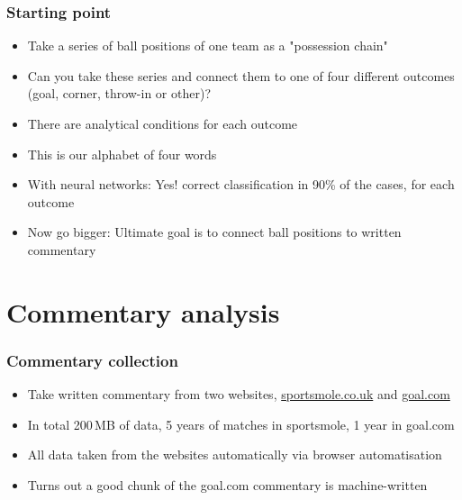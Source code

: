 \documentclass{beamer}
\begin{document}
\begin{frame}
\frametitle{Starting point}
\begin{itemize}
\item Take a series of ball positions of one team as a "possession chain"
\item Can you take these series and connect them to one of four different outcomes (goal, corner, throw-in or other)?
\item There are analytical conditions for each outcome
\item This is our alphabet of four words
\item With neural networks: Yes! correct classification in 90\% of the cases, for each outcome
\item Now go bigger: Ultimate goal is to connect ball positions to written commentary
\end{itemize}
\end{frame}

\section{Commentary analysis}

\begin{frame}
\frametitle{Commentary collection}
\begin{itemize}
\item Take written commentary from two websites, \url{sportsmole.co.uk} and \url{goal.com}
\item In total 200\,MB of data, 5 years of matches in sportsmole, 1 year in goal.com
\item All data taken from the websites automatically via browser automatisation
\item Turns out a good chunk of the goal.com commentary is machine-written
\end{itemize}
\end{frame}
\end{document}
